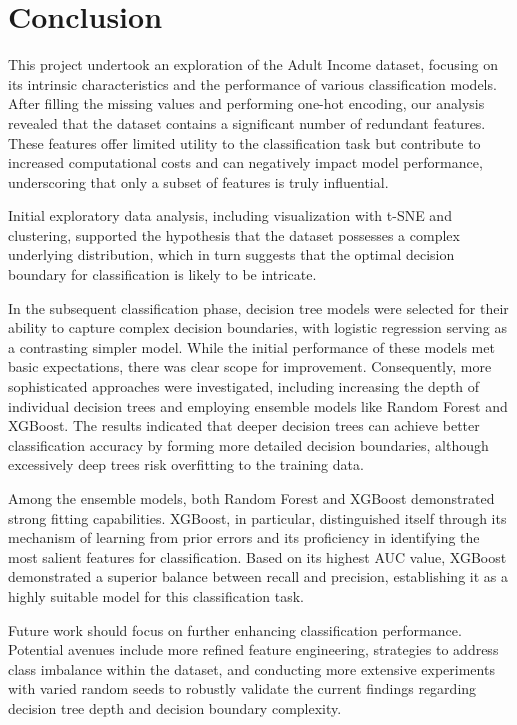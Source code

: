 \documentclass{article}
\begin{document}
\section{Conclusion}

This project undertook an exploration of the Adult Income dataset, focusing on its intrinsic characteristics and the performance of various classification models. After filling the missing values and performing one-hot encoding, our analysis revealed that the dataset contains a significant number of redundant features. These features offer limited utility to the classification task but contribute to increased computational costs and can negatively impact model performance, underscoring that only a subset of features is truly influential.

Initial exploratory data analysis, including visualization with t-SNE and clustering, supported the hypothesis that the dataset possesses a complex underlying distribution, which in turn suggests that the optimal decision boundary for classification is likely to be intricate.

In the subsequent classification phase, decision tree models were selected for their ability to capture complex decision boundaries, with logistic regression serving as a contrasting simpler model. While the initial performance of these models met basic expectations, there was clear scope for improvement. Consequently, more sophisticated approaches were investigated, including increasing the depth of individual decision trees and employing ensemble models like Random Forest and XGBoost. The results indicated that deeper decision trees can achieve better classification accuracy by forming more detailed decision boundaries, although excessively deep trees risk overfitting to the training data.

Among the ensemble models, both Random Forest and XGBoost demonstrated strong fitting capabilities. XGBoost, in particular, distinguished itself through its mechanism of learning from prior errors and its proficiency in identifying the most salient features for classification. Based on its highest AUC value, XGBoost demonstrated a superior balance between recall and precision, establishing it as a highly suitable model for this classification task.

Future work should focus on further enhancing classification performance. Potential avenues include more refined feature engineering, strategies to address class imbalance within the dataset, and conducting more extensive experiments with varied random seeds to robustly validate the current findings regarding decision tree depth and decision boundary complexity.
\end{document}
